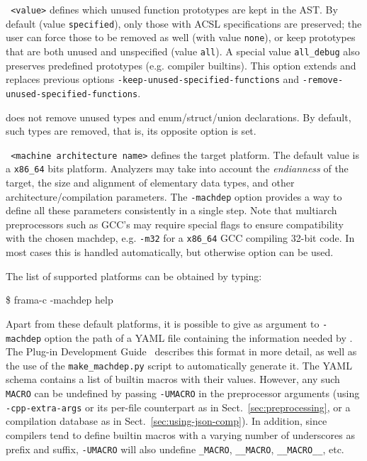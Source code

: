 \begin{description}
\item \texttt{ <value>} defines which
  unused function prototypes are kept in the AST. By default (value
  \texttt{specified}), only those with ACSL specifications are preserved;
  the user can force those to be removed as well (with value \texttt{none}),
  or keep prototypes that are both unused and unspecified (value \texttt{all}).
  A special value \texttt{all\_debug} also preserves predefined prototypes
  (e.g. compiler builtins).
  This option extends and replaces previous options
  \texttt{-keep-unused-specified-functions} and
  \texttt{-remove-unused-specified-functions}.

\item {} does not remove unused types and
  enum/struct/union declarations. By default, such types are removed,
  that is, its opposite option  is set.

\item \texttt{ <machine architecture name>} defines the
  target platform. The default value is a \texttt{x86\_64} bits
  platform. Analyzers may take into account the \emph{endianness} of the
  target, the size and alignment of elementary data types, and other
  architecture/compilation parameters. The \texttt{-machdep} option provides a
  way to define all these parameters consistently in a single step.
  Note that multiarch preprocessors such as GCC's may require special flags
  to ensure compatibility with the chosen machdep, e.g. \texttt{-m32} for a
  \texttt{x86\_64} GCC compiling 32-bit code. In most cases this is handled
  automatically, but otherwise option  can be used.

The list of supported platforms can be obtained by typing:
\begin{frama-c-commands}
\$ frama-c -machdep help
\end{frama-c-commands}

Apart from these default platforms, it is possible to give as argument
to \texttt{-machdep} option the path of a YAML file containing the information
needed by \FramaC. The Plug-in Development Guide~\cite{plugin-dev-guide} describes
this format in more detail, as well as the use of the \texttt{make\_machdep.py}
script to automatically generate it. The YAML schema contains a list of builtin
macros with their values. However, any such \texttt{MACRO} can be undefined by passing
\texttt{-UMACRO} in the preprocessor arguments
(using \texttt{-cpp-extra-args} or its per-file counterpart as in Sect.~\ref{sec:preprocessing},
or a compilation database as in Sect.~\ref{sec:using-json-comp}). In addition,
since compilers tend to define builtin macros with a varying number of
underscores as prefix and suffix, \texttt{-UMACRO} will also undefine
\texttt{\_MACRO}, \texttt{\_\_MACRO}, \texttt{\_\_MACRO\_\_}, etc.


\end{description}
